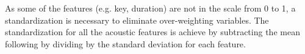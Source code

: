 As some of the features (e.g. key, duration) are not in the scale from 0 to 1, a standardization is necessary to eliminate over-weighting variables. The standardization for all the acoustic features is achieve by subtracting the mean following by dividing by the standard deviation for each feature. 


